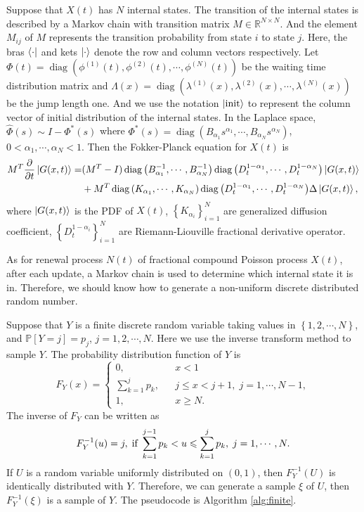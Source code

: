 \documentclass[aps, pre, preprint, amsmath, amssymb]{revtex4}
\newcommand{\R}{\mathbb{R}}
\renewcommand{\P}{\mathbb{P}}
\DeclareMathOperator{\diag}{diag}
\newcommand{\xiaokuo}[1]{\left(#1\right)}
\newcommand{\zhongkuo}[1]{\left[#1\right]}
\newcommand{\dakuo}[1]{\left\{#1\right\}}
\begin{document}
Suppose that $X(t)$ has $N$ internal states. The transition of the internal states is described by a Markov chain with transition matrix $M\in \R^{N\times N}$.  
And the element $M_{ij}$ of $M$ represents the transition probability from state $i$ to state $j$.
Here, the bras $\bra{\cdot}$ and kets $\ket{\cdot}$ denote the row and column vectors respectively.
Let $\Phi(t)=\diag{\xiaokuo{\phi^{(1)}(t), \phi^{(2)}(t), \cdots, \phi^{(N)}(t)}}$ be the waiting time distribution matrix and $\Lambda(x)=\diag{\xiaokuo{\lambda^{(1)}(x), \lambda^{(2)}(x), \cdots, \lambda^{(N)}(x)}}$ be the jump length one.
And we use the notation $\ket{\textnormal{init}}$ to represent the column vector of initial distribution of the internal states.
In the Laplace space, $\widehat{\Phi}(s)\sim I-\Phi^*(s)$ where $\Phi^*(s)=\diag{\xiaokuo{B_{\alpha_1}s^{\alpha_1}, \cdots, B_{\alpha_N}s^{\alpha_N}}}$, $0<\alpha_1, \cdots, \alpha_N < 1$.
Then the Fokker-Planck equation for $X(t)$ is  \cite{RN67}
\begin{equation}
\begin{aligned}
M^{T}\frac{\partial}{\partial t}\ket{G({x}, t)}=&
(M^T-I)\diag{\xiaokuo{B_{\alpha_1}^{-1}, \cdots, B_{\alpha_N}^{-1}}}\diag{\xiaokuo{D_t^{1-\alpha_1}, \cdots, D_t^{1-\alpha_N}}}\ket{G(x, t)}\\
&+ M^T\diag{\xiaokuo{K_{\alpha_1}, \cdots, K_{\alpha_N}}}\diag{\xiaokuo{D_t^{1-\alpha_1}, \cdots, D_t^{1-\alpha_N}}}\Delta\ket{G(x, t)},
\end{aligned}
\end{equation}
where $\ket{G(x,t)}$ is the PDF of $X(t)$, $\dakuo{K_{\alpha_i}}_{i=1}^N$ are generalized diffusion coefficient, $\dakuo{D_t^{1-\alpha_i}}_{i=1}^N$ are Riemann-Liouville fractional derivative operator.

As for renewal process $N(t)$ of fractional compound Poisson process $X(t)$, after each update, a Markov chain is used to determine which internal state it is in. 
Therefore, we should know how to generate a non-uniform discrete distributed random number.

Suppose that $Y$ is a finite discrete random variable taking values in $\dakuo{1,2,\cdots, N}$, and 
$\P\zhongkuo{Y=j}=p_j$, $j=1,2,\cdots, N$.
Here we use the inverse transform method to sample $Y$.
The probability distribution function of $Y$ is 
\begin{equation}
F_{Y}(x) = \left\{
\begin{array}{lll}
0, & & x<1 \\
\sum\limits_{k=1}^{j}p_k, & & j\leqslant x < j+1, \; j=1,\cdots, N-1, \\
1, & & x\geqslant N.
\end{array}
\right.
\end{equation}
The inverse of $F_{Y}$ can be written as 
\begin{equation}
F^{-1}_{Y}(u) = j, \;\textnormal{if } \sum_{k=1}^{j-1}p_k<u\leqslant\sum_{k=1}^jp_k, \; j=1, \cdots, N.
\end{equation}
If $U$ is a random variable uniformly distributed on $(0,1)$, then $F^{-1}_Y(U)$ is identically distributed with $Y$.
Therefore, we can generate a sample $\xi$ of $U$, then $F_{Y}^{-1}(\xi)$ is a sample of $Y$. 
The pseudocode is Algorithm \ref{alg:finite}.
\end{document}
